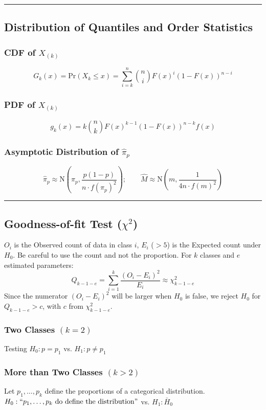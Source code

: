 \documentclass{article}
\begin{document}
\begin{multicols*}{2}
\noindent\rule{\linewidth}{0.25pt}
\subsection*{Distribution of Quantiles and Order Statistics}
\subsubsection*{CDF of $X_{(k)}$}
$$G_{k}(x) = \mbox{Pr}(X_{k} \leq x) = \sum_{i=k}^{n} \binom{n}{i} F(x)^{i} (1 - F(x))^{n-i}$$
\subsubsection*{PDF of $X_{(k)}$}
$$g_{k}(x) = k \binom{n}{k} F(x)^{k-1} (1 - F(x))^{n-k} f(x)$$
\subsubsection*{Asymptotic Distribution of $\hat{\pi}_{p}$}
$$\hat{\pi}_{p} \approx \mbox{N}\left(\pi_{p}, \frac{p(1-p)}{n \cdot f(\pi_{p})^{2}}\right); \qquad \hat{M} \approx \mbox{N}\left(m, \frac{1}{4n \cdot f(m)^{2}}\right)$$

\noindent\rule{\linewidth}{0.25pt}
\subsection*{Goodness-of-fit Test ($\chi^{2}$)}
$O_{i}$ is the Observed count of data in class $i$, $E_{i}$ {\color{red} ($> 5$)} is the Expected count under $H_{0}$. Be careful to use the count and not the proportion. For $k$ classes and $e$ estimated parameters:
$$Q_{k-1-e} = \sum_{i=1}^{k} \frac{(O_{i} - E_{i})^{2}}{E_{i}} \approx \chi^{2}_{k-1-e}$$
Since the numerator $(O_{i} - E_{i})^{2}$ will be larger when $H_{0}$ is false, we reject $H_{0}$ for $Q_{k-1-e} > c$, with $c$ from $\chi^{2}_{k-1-e}$.
\subsubsection*{Two Classes $(k = 2)$}
Testing $H_{0}: p = p_{1}$ vs. $H_{1}: p \neq p_{1}$
\subsubsection*{More than Two Classes $(k > 2)$}
Let $p_{1}, \dots, p_{k}$ define the proportions of a categorical distribution. $H_{0}: ``p_{1}, \dots, p_{k} \mbox{ do define the distribution}"$ vs. $H_{1}: \bar{H}_{0}$


\end{multicols*}
\end{document}
